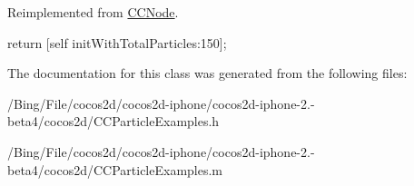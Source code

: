 Reimplemented from \hyperlink{class_c_c_node_ad789cad83aca65c130abd4452d1bc081}{C\-C\-Node}.


\begin{DoxyCode}
{
        return [self initWithTotalParticles:150];
}
\end{DoxyCode}


The documentation for this class was generated from the following files\-:\begin{DoxyCompactItemize}
\item 
/\-Bing/\-File/cocos2d/cocos2d-\/iphone/cocos2d-\/iphone-\/2.-\/beta4/cocos2d/C\-C\-Particle\-Examples.\-h\item 
/\-Bing/\-File/cocos2d/cocos2d-\/iphone/cocos2d-\/iphone-\/2.-\/beta4/cocos2d/C\-C\-Particle\-Examples.\-m\end{DoxyCompactItemize}

